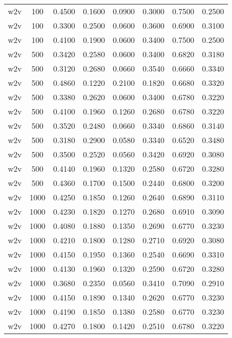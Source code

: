 \begin{table}[h!]
\begin{tabularx}{\textwidth}{cccccccc}
		w2v      & 100  & 0.4500 & 0.1600 & 0.0900 & 0.3000 & 0.7500 & 0.2500 \\
		w2v      & 100  & 0.3300 & 0.2500 & 0.0600 & 0.3600 & 0.6900 & 0.3100 \\
		w2v      & 100  & 0.4100 & 0.1900 & 0.0600 & 0.3400 & 0.7500 & 0.2500 \\
		w2v      & 500  & 0.3420 & 0.2580 & 0.0600 & 0.3400 & 0.6820 & 0.3180 \\
		w2v      & 500  & 0.3120 & 0.2680 & 0.0660 & 0.3540 & 0.6660 & 0.3340 \\
		w2v      & 500  & 0.4860 & 0.1220 & 0.2100 & 0.1820 & 0.6680 & 0.3320 \\
		w2v      & 500  & 0.3380 & 0.2620 & 0.0600 & 0.3400 & 0.6780 & 0.3220 \\
		w2v      & 500  & 0.4100 & 0.1960 & 0.1260 & 0.2680 & 0.6780 & 0.3220 \\
		w2v      & 500  & 0.3520 & 0.2480 & 0.0660 & 0.3340 & 0.6860 & 0.3140 \\
		w2v      & 500  & 0.3180 & 0.2900 & 0.0580 & 0.3340 & 0.6520 & 0.3480 \\
		w2v      & 500  & 0.3500 & 0.2520 & 0.0560 & 0.3420 & 0.6920 & 0.3080 \\
		w2v      & 500  & 0.4140 & 0.1960 & 0.1320 & 0.2580 & 0.6720 & 0.3280 \\
		w2v      & 500  & 0.4360 & 0.1700 & 0.1500 & 0.2440 & 0.6800 & 0.3200 \\
		w2v      & 1000 & 0.4250 & 0.1850 & 0.1260 & 0.2640 & 0.6890 & 0.3110 \\
		w2v      & 1000 & 0.4230 & 0.1820 & 0.1270 & 0.2680 & 0.6910 & 0.3090 \\
		w2v      & 1000 & 0.4080 & 0.1880 & 0.1350 & 0.2690 & 0.6770 & 0.3230 \\
		w2v      & 1000 & 0.4210 & 0.1800 & 0.1280 & 0.2710 & 0.6920 & 0.3080 \\
		w2v      & 1000 & 0.4150 & 0.1950 & 0.1360 & 0.2540 & 0.6690 & 0.3310 \\
		w2v      & 1000 & 0.4130 & 0.1960 & 0.1320 & 0.2590 & 0.6720 & 0.3280 \\
		w2v      & 1000 & 0.3680 & 0.2350 & 0.0560 & 0.3410 & 0.7090 & 0.2910 \\
		w2v      & 1000 & 0.4150 & 0.1890 & 0.1340 & 0.2620 & 0.6770 & 0.3230 \\
		w2v      & 1000 & 0.4190 & 0.1850 & 0.1380 & 0.2580 & 0.6770 & 0.3230 \\
		w2v      & 1000 & 0.4270 & 0.1800 & 0.1420 & 0.2510 & 0.6780 & 0.3220 \\

\end{tabularx}
\end{table}
